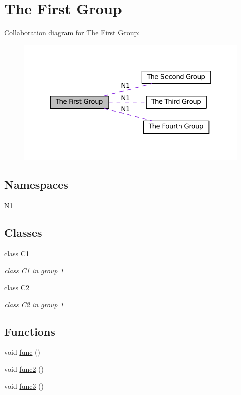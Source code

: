 \hypertarget{group__group1}{}\section{The First Group}
\label{group__group1}
Collaboration diagram for The First Group\+:
\nopagebreak
\begin{figure}[H]
\begin{center}
\leavevmode
\includegraphics[width=324pt]{group__group1}
\end{center}
\end{figure}
\subsection*{Namespaces}
\begin{DoxyCompactItemize}
\item 
 \hyperlink{namespaceN1}{N1}
\end{DoxyCompactItemize}
\subsection*{Classes}
\begin{DoxyCompactItemize}
\item 
class \hyperlink{classC1}{C1}
\begin{DoxyCompactList}\small\item\em class \hyperlink{classC1}{C1} in group 1 \end{DoxyCompactList}\item 
class \hyperlink{classC2}{C2}
\begin{DoxyCompactList}\small\item\em class \hyperlink{classC2}{C2} in group 1 \end{DoxyCompactList}\end{DoxyCompactItemize}
\subsection*{Functions}
\begin{DoxyCompactItemize}
\item 
void \hyperlink{group__group1_ga24f647174760cac13d2624b5ad74b00c}{func} ()
\item 
void \hyperlink{group__group1_ga053929c0809a5f56f7548fd7d9968f31}{func2} ()
\item 
void \hyperlink{group__group1_gadbf675591ff057ec48ce35b0d5cdf755}{func3} ()
\end{DoxyCompactItemize}


